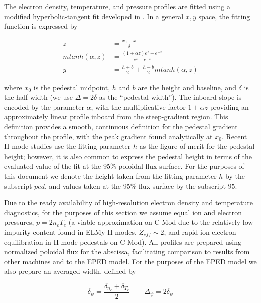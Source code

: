 The electron density, temperature, and pressure profiles are fitted using a modified hyperbolic-tangent fit developed in \cite{Groebner2001}.  In a general $x,y$ space, the fitting function is expressed by

\begin{equation}\label{eq:mtanh}
 \begin{aligned}
  z &= \frac{x_0 - x}{\delta}\\
  mtanh(\alpha,z) &= \frac{(1 + \alpha z) e^z - e^{-z}}{e^z + e^{-z}}\\
  y &= \frac{h+b}{2} + \frac{h-b}{2} mtanh(\alpha,z)
 \end{aligned}
\end{equation}

\noindent where $x_0$ is the pedestal midpoint, $h$ and $b$ are the height and baseline, and $\delta$ is the half-width (we use $\Delta = 2\delta$ as the ``pedestal width'').  The inboard slope is encoded by the parameter $\alpha$, with the multiplicative factor $1 + \alpha z$ providing an approximately linear profile inboard from the steep-gradient region.  This definition provides a smooth, continuous definition for the pedestal gradient throughout the profile, with the peak gradient found analytically at $x_0$.  Recent H-mode studies use the fitting parameter $h$ as the figure-of-merit for the pedestal height; however, it is also common to express the pedestal height in terms of the evaluated value of the fit at the 95\% poloidal flux surface.  For the purposes of this document we denote the height taken from the fitting parameter $h$ by the subscript $ped$, and values taken at the 95\% flux surface by the subscript $95$. 

Due to the ready availability of high-resolution electron density and temperature diagnostics, for the purposes of this section we assume equal ion and electron pressures, $p = 2n_e T_e$ (a viable approximation on C-Mod due to the relatively low impurity content found in ELMy H-modes, $Z_{eff} \sim 2$, and rapid ion-electron equilibration in H-mode pedestals on C-Mod).  All profiles are prepared using normalized poloidal flux for the abscissa, facilitating comparison to results from other machines and to the EPED model.  For the purposes of the EPED model we also prepare an averaged width, defined by

\begin{equation}
  \delta_\psi = \frac{\delta_{n_e} + \delta_{T_e}}{2}\qquad
  \Delta_\psi = 2\delta_\psi
\end{equation}

